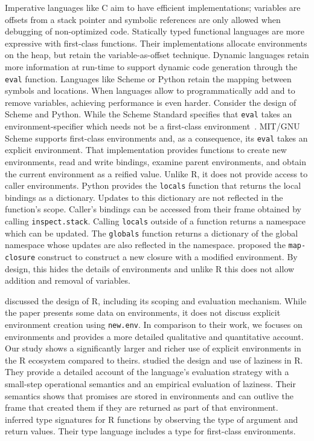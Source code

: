 \documentclass[10pt,sigplan,authorversion=true]{acmart}
\renewcommand{\c}[1]{\lstinline |#1|\xspace}
\begin{document}
Imperative languages like C aim to have efficient implementations; variables are
offsets from a stack pointer and symbolic references are only allowed when
debugging of non-optimized code. Statically typed functional languages are more
expressive with first-class functions. Their implementations allocate
environments on the heap, but retain the variable-as-offset technique. Dynamic
languages retain more information at run-time to support dynamic code generation
through the \c{eval} function. Languages like Scheme or Python retain the
mapping between symbols and locations. When languages allow to programmatically
add and to remove variables, achieving performance is even harder. Consider the
design of Scheme and Python. While the Scheme Standard specifies that
\c{eval} takes an environment-specifier which needs not be a first-class
environment~\cite{SchemeR5RS}. MIT/GNU Scheme supports first-class environments
and, as a consequence, its \c{eval} takes an explicit environment. That
implementation provides functions to create new environments, read and write
bindings, examine parent environments, and obtain the current environment as a
reified value. Unlike R, it does not provide access to caller environments.
Python provides the \c{locals} function that returns the local bindings as a
dictionary. Updates to this dictionary are not reflected in the function's
scope. Caller's bindings can be accessed from their frame obtained by calling
\c{inspect.stack}. Calling \c{locals} outside of a function returns a
namespace which can be updated. The \c{globals} function returns a dictionary
of the global namespace whose updates are also reflected in the namespace.
\citet{Siskind07} proposed the \c{map-closure} construct to construct a new
closure with a modified environment. By design, this hides the details of
environments and unlike R this does not allow addition and removal of variables.

\citet{ecoop12} discussed the design of R, including its scoping and evaluation
mechanism. While the paper presents some data on environments, it does not
discuss explicit environment creation using \c{new.env}. In comparison to
their work, we focuses on environments and provides a more detailed qualitative
and quantitative account. Our study shows a significantly larger and richer use
of explicit environments in the R ecosystem compared to theirs.
\citet{oopsla19b} studied the design and use of laziness in R. They provide a
detailed account of the language’s evaluation strategy with a small-step
operational semantics and an empirical evaluation of laziness. Their semantics
shows that promises are stored in environments and can outlive the frame that
created them if they are returned as part of that environment. \citet{oopsla20b}
inferred type signatures for R functions by observing the type of argument and
return values. Their type language includes a type for first-class environments.
\end{document}
